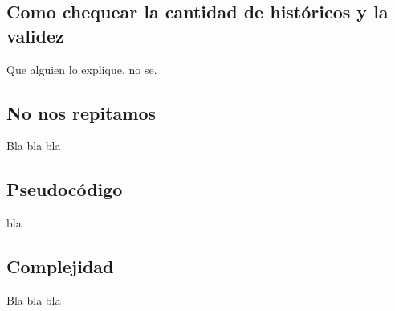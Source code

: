 \subsection{Como chequear la cantidad de históricos y la validez}
Que alguien lo explique, no se.

\subsection{No nos repitamos}
Bla bla bla

\subsection{Pseudocódigo}
bla

\subsection{Complejidad}
Bla bla bla